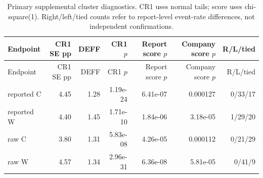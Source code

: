 \begin{longtable}{lrrrrrr}
\caption{Primary supplemental cluster diagnostics. CR1 uses normal tails; score uses chi-square(1). Right/left/tied counts refer to report-level event-rate differences, not independent confirmations.}\\
Endpoint & CR1 SE pp & DEFF & CR1 $p$ & Report score $p$ & Company score $p$ & R/L/tied\\\toprule\endfirsthead
Endpoint & CR1 SE pp & DEFF & CR1 $p$ & Report score $p$ & Company score $p$ & R/L/tied\\\toprule\endhead
reported C & 4.45 & 1.28 & 1.19e-24 & 6.41e-07 & 0.000127 & 0/33/17\\
reported W & 4.40 & 1.45 & 1.71e-10 & 1.84e-06 & 3.18e-05 & 1/29/20\\
raw C & 3.80 & 1.31 & 5.83e-08 & 4.26e-05 & 0.000112 & 0/21/29\\
raw W & 4.57 & 1.34 & 2.96e-31 & 6.36e-08 & 5.81e-05 & 0/41/9\\
\bottomrule\end{longtable}